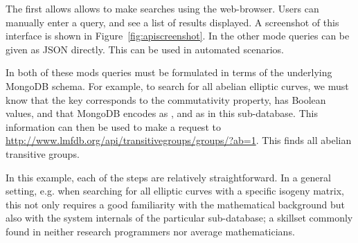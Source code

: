 The first allows allows to make searches using the web-browser.  Users can manually enter
a query, and see a list of results displayed.  A screenshot of this interface is shown in
Figure~\ref{fig:apiscreenshot}.  In the other mode queries can be given as JSON
directly.  This can be used in automated scenarios.

In both of these mods queries must be formulated in terms of the underlying MongoDB
schema. For example, to search for all abelian elliptic curves, we must know that the
 key
corresponds to the commutativity property, has Boolean values, and that MongoDB encodes
 as , and  as  in this
\lmfdb sub-database. This information can then be used to make a request to
\url{http://www.lmfdb.org/api/transitivegroups/groups/?ab=1}. This finds all abelian transitive 
groups.

In this example, each of the steps are relatively straightforward. 
In a general setting, e.g. when searching for all elliptic curves with a specific isogeny
matrix, this not only requires a good familiarity with the mathematical background but
also with the system internals of the particular \lmfdb sub-database; a skillset commonly
found in neither research programmers nor average mathematicians.   


